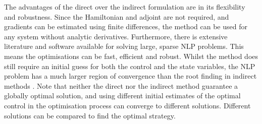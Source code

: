 The advantages of the direct over the indirect formulation are in its flexibility and robustness. Since the Hamiltonian and adjoint are not required, and gradients can be estimated using finite differences, the method can be used for any system without analytic derivatives. Furthermore, there is extensive literature and software available for solving large, sparse NLP problems. This means the optimisations can be fast, efficient and robust. Whilst the method does still require an initial guess for both the control and the state variables, the NLP problem has a much larger region of convergence than the root finding in indirect methods \citep{betts_practical_2010}. Note that neither the direct nor the indirect method guarantee a globally optimal solution, and using different initial estimates of the optimal control in the optimisation process can converge to different solutions. Different solutions can be compared to find the optimal strategy.

